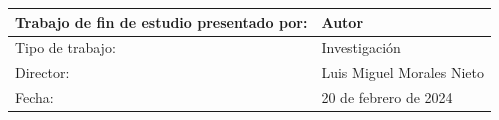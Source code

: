 \begin{titlepage}
    \begingroup
    \renewcommand{\arraystretch}{0.8} %
    \begin{center}
        \begin{tabular}{| l | l |}
            \hline
            Trabajo de fin de estudio presentado por: & Autor \\ \hline
            Tipo de trabajo: & Investigación \\ \hline
            Director: & Luis Miguel Morales Nieto \\ \hline
            Fecha: & 20 de febrero de 2024 \\ \hline %
        \end{tabular}
    \end{center}
    \endgroup


\vfill
\end{titlepage}